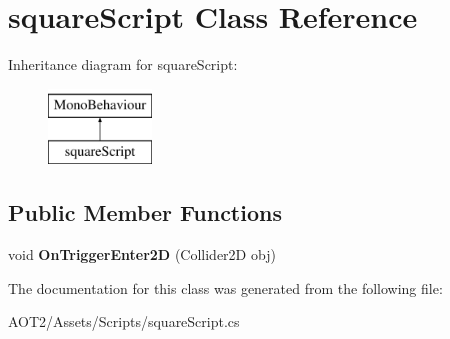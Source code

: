 \hypertarget{classsquare_script}{}\section{square\+Script Class Reference}
\label{classsquare_script}
Inheritance diagram for square\+Script\+:\begin{figure}[H]
\begin{center}
\leavevmode
\includegraphics[height=2.000000cm]{classsquare_script}
\end{center}
\end{figure}
\subsection*{Public Member Functions}
\begin{DoxyCompactItemize}
\item 
\hypertarget{classsquare_script_a63e48b93a844b2a14c3e3a691165d8fb}{}void {\bfseries On\+Trigger\+Enter2\+D} (Collider2\+D obj)\label{classsquare_script_a63e48b93a844b2a14c3e3a691165d8fb}

\end{DoxyCompactItemize}


The documentation for this class was generated from the following file\+:\begin{DoxyCompactItemize}
\item 
A\+O\+T2/\+Assets/\+Scripts/square\+Script.\+cs\end{DoxyCompactItemize}
